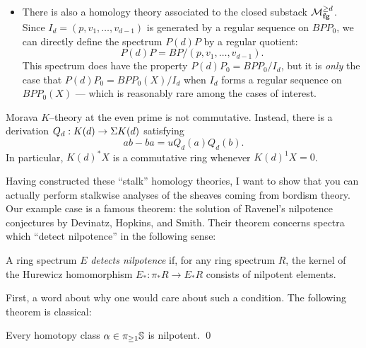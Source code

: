 \begin{definition}
\begin{itemize}
\item There is also a homology theory associated to the closed substack $\moduli{fg}^{\ge d}$.  Since $I_d = (p, v_1, \ldots, v_{d-1})$ is generated by a regular sequence on $BPP_0$, we can directly define the spectrum $P(d)P$ by a regular quotient: \[P(d)P = BP / (p, v_1, \ldots, v_{d-1}).\]  This spectrum does have the property $P(d)P_0 = BPP_0 / I_d$, but it is \emph{only} the case that $P(d)P_0 = BPP_0(X) / I_d$ when $I_d$ forms a regular sequence on $BPP_0(X)$ --- which is reasonably rare among the cases of interest.
\end{itemize}
\end{definition}

\begin{remark}\label{MoravaKIsNotCommutative}
Morava $K$--theory at the even prime is not commutative.  Instead, there is a derivation $Q_d: K(d) \to \Susp K(d)$ satisfying \[ab - ba = u Q_d(a) Q_d(b).\]  In particular, $K(d)^* X$ is a commutative ring whenever $K(d)^1 X = 0$.
\end{remark}

Having constructed these ``stalk'' homology theories, I want to show that you can actually perform stalkwise analyses of the sheaves coming from bordism theory.  Our example case is a famous theorem: the solution of Ravenel's nilpotence conjectures by Devinatz, Hopkins, and Smith.  Their theorem concerns spectra which ``detect nilpotence'' in the following sense:


\begin{definition}
A ring spectrum $E$ \textit{detects nilpotence} if, for any ring spectrum $R$, the kernel of the Hurewicz homomorphism $E_*: \pi_* R \to E_* R$ consists of nilpotent elements.
\end{definition}

First, a word about why one would care about such a condition.  The following theorem is classical:
\begin{theorem}[Nishida]
Every homotopy class $\alpha \in \pi_{\ge 1} \S$ is nilpotent. \qed
\end{theorem}

